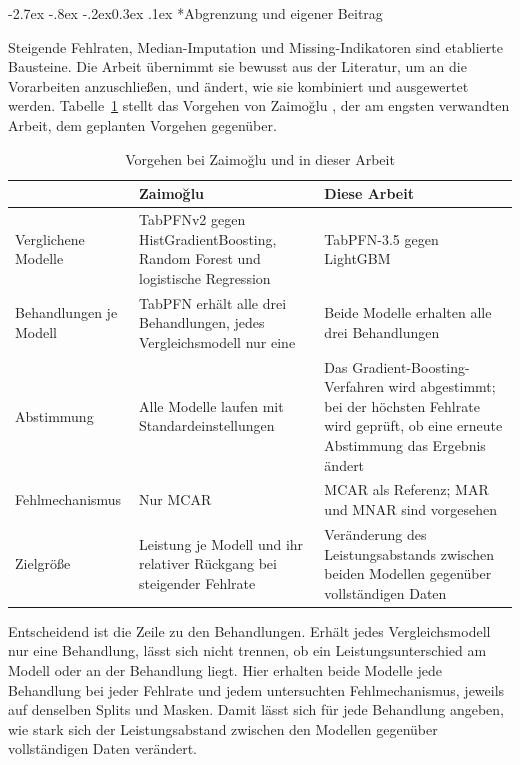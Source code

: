 \documentclass[12pt,a4paper]{article}
\makeatletter
\renewcommand\subsection{\@startsection{subsection}{2}{\z@}%
  {-2.7ex \@plus -.8ex \@minus -.2ex}{0.3ex \@plus .1ex}%
  {\normalfont\large\bfseries}}
\makeatother
\begin{document}
\subsection*{Abgrenzung und eigener Beitrag}

Steigende Fehlraten, Median-Imputation und Missing-Indikatoren sind
etablierte Bausteine. Die Arbeit übernimmt sie bewusst aus der
Literatur, um an die Vorarbeiten anzuschließen, und ändert, wie sie
kombiniert und ausgewertet werden. Tabelle~\ref{tab:abgrenzung} stellt
das Vorgehen von Zaimo\u{g}lu \cite{zaimoglu_tabpfn_2026}, der am
engsten verwandten Arbeit, dem geplanten Vorgehen gegenüber.

\begin{table}[htb]
\centering
\small
\caption{Vorgehen bei Zaimo\u{g}lu \cite{zaimoglu_tabpfn_2026} und in
dieser Arbeit}
\label{tab:abgrenzung}
\begin{tabular}{@{}>{\raggedright\arraybackslash}p{2.9cm}
                >{\raggedright\arraybackslash}p{5.9cm}
                >{\raggedright\arraybackslash}p{5.9cm}@{}}
\toprule
 & \textbf{Zaimo\u{g}lu \cite{zaimoglu_tabpfn_2026}} & \textbf{Diese Arbeit}\\
\midrule
Verglichene Modelle
  & TabPFNv2 gegen HistGradientBoosting, Random Forest und
    logistische Regression
  & TabPFN-3.5 gegen LightGBM\\
\addlinespace
Behandlungen je Modell
  & TabPFN erhält alle drei Behandlungen, jedes Vergleichsmodell
    nur eine \cite[Tabelle II]{zaimoglu_tabpfn_2026}
  & Beide Modelle erhalten alle drei Behandlungen\\
\addlinespace
Abstimmung
  & Alle Modelle laufen mit Standardeinstellungen
  & Das Gradient-Boosting-Verfahren wird abgestimmt; bei der
    höchsten Fehlrate wird geprüft, ob eine erneute Abstimmung das
    Ergebnis ändert\\
\addlinespace
Fehlmechanismus
  & Nur MCAR
  & MCAR als Referenz; MAR und MNAR sind vorgesehen\\
\addlinespace
Zielgröße
  & Leistung je Modell und ihr relativer Rückgang bei steigender
    Fehlrate
  & Veränderung des Leistungsabstands zwischen beiden Modellen
    gegenüber vollständigen Daten\\
\bottomrule
\end{tabular}
\end{table}

Entscheidend ist die Zeile zu den Behandlungen. Erhält jedes
Vergleichsmodell nur eine Behandlung, lässt sich nicht trennen, ob ein
Leistungsunterschied am Modell oder an der Behandlung liegt. Hier
erhalten beide Modelle jede Behandlung bei jeder Fehlrate und jedem
untersuchten Fehlmechanismus, jeweils auf denselben Splits und Masken.
Damit lässt sich für jede Behandlung angeben, wie stark sich der
Leistungsabstand zwischen den Modellen gegenüber vollständigen Daten
verändert.
\end{document}
